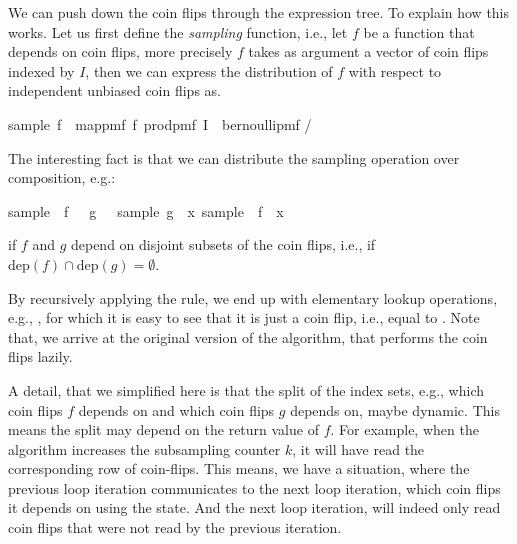 We can push down the coin flips through the expression tree.
To explain how this works.
Let us first define the \emph{sampling} function, i.e., let $f$ be a function that depends on coin flips, more precisely $f$ takes as argument a vector of coin flips indexed by $I$, then we can express the distribution of $f$ with respect to independent unbiased coin flips as.
\begin{isabelle_cm}
  sample\ f\ \isacharequal\ map{\isacharunderscore}pmf\ f\ {\isacharparenleft}prod{\isacharunderscore}pmf\ I\ {\isacharparenleft}\isasymlambda\isacharunderscore\isachardot\ bernoulli{\isacharunderscore}pmf \isacharparenleft{}/\isacharparenright\isacharparenright\isacharparenright
\end{isabelle_cm}
The interesting fact is that we can distribute the sampling operation over composition, e.g.:
\begin{isabelle_cm}
  sample\ \isacharparenleft\isasymlambda\isasymomega\isachardot\ f\ \isasymomega\ \isasymcirc\ g\ \isasymomega{\isacharparenright}\ \isacharequal\ sample\ g\ \isasymbind\ \isacharparenleft{\isasymlambda}x\isachardot\ sample\ \isacharparenleft\isasymlambda\isasymomega\isachardot\ f\ \isasymomega\isachardot\ x\isacharparenright\isacharparenright
\end{isabelle_cm}
if $f$ and $g$ depend on disjoint subsets of the coin flips, i.e., if $\mathrm{dep}(f) \cap \mathrm{dep}(g) = \emptyset$.

By recursively applying the rule, we end up with elementary lookup operations, e.g., , for which it is easy to see that it is just a coin flip, i.e., equal to .
Note that, we arrive at the original version of the algorithm, that performs the coin flips lazily.

A detail, that we simplified here is that the split of the index sets, e.g., which coin flips $f$ depends on and which coin flips $g$ depends on, maybe dynamic.
This means the split may depend on the return value of $f$.
For example, when the algorithm increases the subsampling counter $k$, it will have read the corresponding row of coin-flips.
This means, we have a situation, where the previous loop iteration communicates to the next loop iteration, which coin flips it depends on using the state.
And the next loop iteration, will indeed only read coin flips that were not read by the previous iteration.

